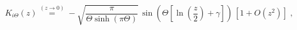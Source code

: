 \begin{equation}
K_{i\Theta} (z) 
  \stackrel{(z \rightarrow 0)}{=}
-
\sqrt{ \frac{\pi}{ \Theta 
\sinh  \left( \pi \Theta \right) } }
\,
\sin
\left(
\Theta
\left[
\ln \left( \frac{ z }{2} \right) 
+ \gamma
\right]
\right)
\,
\left[ 1 + O \left( z^{2} \right)  \right] 
\;  ,
\label{eq:macdonald_small_argument}
\end{equation}

